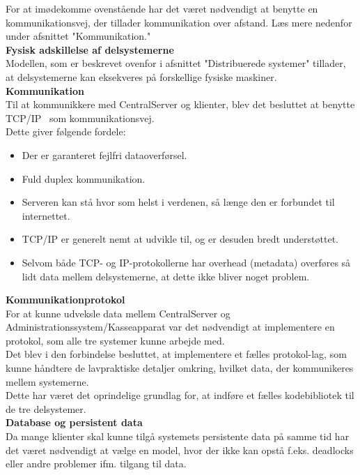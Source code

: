 For at imødekomme ovenstående har det været nødvendigt at benytte en kommunikationsvej, der tillader kommunikation over afstand. Læs mere nedenfor under afsnittet "Kommunikation."\\

\textbf{Fysisk adskillelse af delsystemerne}\\
Modellen, som er beskrevet ovenfor i afsnittet "Distribuerede systemer" tillader, at delsystemerne kan eksekveres på forskellige fysiske maskiner.\\

\textbf{Kommunikation}\\
Til at kommunikkere med CentralServer og klienter, blev det besluttet at benytte TCP/IP~\cite{tcpip} som kommunikationsvej.\\

Dette giver følgende fordele:

\begin{itemize}
	\item Der er garanteret fejlfri dataoverførsel.
	\item Fuld duplex kommunikation.
	\item Serveren kan stå hvor som helst i verdenen, så længe den er forbundet til internettet.
	\item TCP/IP er generelt nemt at udvikle til, og er desuden bredt understøttet.
	\item Selvom både TCP- og IP-protokollerne har overhead (metadata) overføres så lidt data mellem delsystemerne, at dette ikke bliver noget problem.
\end{itemize}

\textbf{Kommunikationprotokol}\\
For at kunne udveksle data mellem CentralServer og Administrationssystem/Kasseapparat var det nødvendigt at implementere en protokol, som alle tre systemer kunne arbejde med.\\

Det blev i den forbindelse besluttet, at implementere et fælles protokol-lag, som kunne håndtere de lavpraktiske detaljer omkring, hvilket data, der kommunikeres mellem systemerne.\\

Dette har været det oprindelige grundlag for, at indføre et fælles kodebibliotek til de tre delsystemer.\\

\textbf{Database og persistent data}\\
Da mange klienter skal kunne tilgå systemets persistente data på samme tid har det været nødvendigt at vælge en model, hvor der ikke kan opstå f.eks. deadlocks eller andre problemer ifm. tilgang til data.\\

